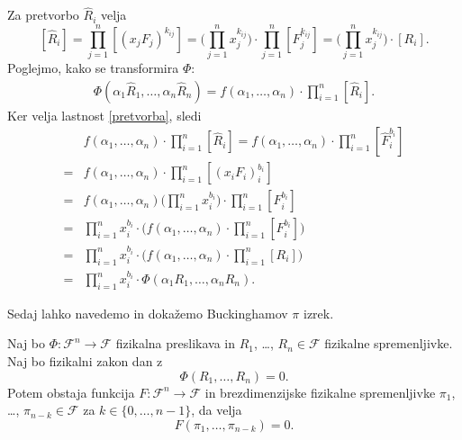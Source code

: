 \documentclass[mat2, tisk]{fmfdelo}
\begin{document}
\begin{dokaz}
Za pretvorbo $\hat{R}_i$ velja 
$$
[\hat{R}_i] = \prod_{j=1}^n [(x_j F_j)^{k_{ij}}] = \Big(\prod_{j=1}^n x_j^{k_{ij}}\Big)\cdot \prod_{j=1}^n [F_j^{k_{ij}}] = \Big(\prod_{j=1}^n x_j^{k_{ij}}\Big) \cdot [R_i].
$$
Poglejmo, kako se transformira $\Phi$:
\begin{align*}
\Phi(\alpha_1 \hat{R}_1, \dots, \alpha_n \hat{R}_n) = f(\alpha_1, \dots, \alpha_n) \cdot \prod_{i=1}^n [\hat{R}_i].
\end{align*}
Ker velja lastnost \eqref{pretvorba}, sledi
\begin{align*}
&f(\alpha_1, \dots, \alpha_n) \cdot \prod_{i=1}^n [\hat{R}_i] = f(\alpha_1, \dots, \alpha_n) \cdot \prod_{i=1}^n [\hat{F}_i^{b_i}] \\
=& f(\alpha_1, \dots, \alpha_n) \cdot \prod_{i=1}^n [(x_i F_i)_i^{b_i}] \\
=& f(\alpha_1, \dots, \alpha_n) \Big(\prod_{i=1}^n x_i^{b_i}\Big) \cdot \prod_{i=1}^n [F_i^{b_i}] \\
=& \prod_{i=1}^n x_i^{b_i} \cdot \Big(f(\alpha_1, \dots, \alpha_n)\cdot \prod_{i=1}^n [F_i^{b_i}] \Big) \\
=& \prod_{i=1}^n x_i^{b_i} \cdot \Big(f(\alpha_1, \dots, \alpha_n)\cdot \prod_{i=1}^n [R_i] \Big) \\
=& \prod_{i=1}^n x_i^{b_i} \cdot \Phi(\alpha_1 R_1, \dots, \alpha_n R_n).
\end{align*}
\end{dokaz}

Sedaj lahko navedemo in dokažemo Buckinghamov $\pi$ izrek.

 \begin{izrek}[Buckinghamov $\pi$]
 Naj bo $\Phi: \mathcal{F}^n \rightarrow \mathcal{F}$ fizikalna preslikava in 
 $R_1$, \dots, $R_n \in \mathcal{F}$ fizikalne spremenljivke. Naj bo fizikalni zakon dan z 
 \begin{equation*}
 \Phi(R_1, \dots, R_n) = 0.
 \end{equation*}
 Potem obstaja funkcija 
 $F: \mathcal{F}^n \rightarrow \mathcal{F}$ in brezdimenzijske fizikalne spremenljivke 
 $\pi_1$, \dots, $\pi_{n-k} \in \mathcal{F}$ za $k \in \{0, \dots, n-1\}$, da velja
 \begin{equation*}
   F(\pi_1, \dots, \pi_{n-k}) = 0.
 \end{equation*}
 \end{izrek}
\end{document}
